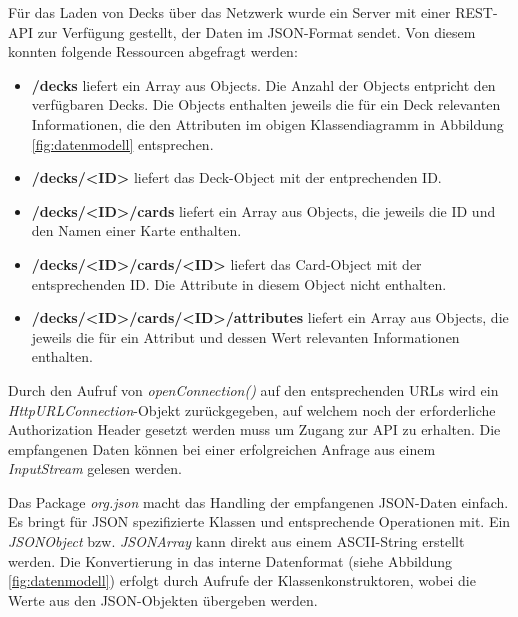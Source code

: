 Für das Laden von Decks über das Netzwerk wurde ein Server mit einer REST-API zur Verfügung gestellt, der Daten im JSON-Format sendet. Von diesem konnten folgende Ressourcen abgefragt werden:
\begin{itemize}
    \item \textbf{/decks} liefert ein Array aus Objects. Die Anzahl der Objects entpricht den verfügbaren Decks. Die Objects enthalten jeweils die für ein Deck relevanten Informationen, die den Attributen im obigen Klassendiagramm in Abbildung \ref{fig:datenmodell} entsprechen.
    \item \textbf{/decks/<ID>} liefert das Deck-Object mit der entprechenden ID.
    \item \textbf{/decks/<ID>/cards} liefert ein Array aus Objects, die jeweils die ID und den Namen einer Karte enthalten.
    \item \textbf{/decks/<ID>/cards/<ID>} liefert das Card-Object mit der entsprechenden ID. Die Attribute in diesem Object nicht enthalten.
    \item \textbf{/decks/<ID>/cards/<ID>/attributes} liefert ein Array aus Objects, die jeweils die für ein Attribut und dessen Wert relevanten Informationen enthalten.
\end{itemize}

Durch den Aufruf von \emph{openConnection()} auf den entsprechenden URLs wird ein \emph{HttpURLConnection}-Objekt zurückgegeben, auf welchem noch der erforderliche Authorization Header gesetzt werden muss um Zugang zur API zu erhalten. Die empfangenen Daten können bei einer erfolgreichen Anfrage aus einem \emph{InputStream} gelesen werden. 

Das Package \emph{org.json} macht das Handling der empfangenen JSON-Daten einfach. Es bringt für JSON spezifizierte Klassen und entsprechende Operationen mit. Ein \emph{JSONObject} bzw. \emph{JSONArray} kann direkt aus einem ASCII-String erstellt werden. Die Konvertierung in das interne Datenformat (siehe Abbildung \ref{fig:datenmodell}) erfolgt durch Aufrufe der Klassenkonstruktoren, wobei die Werte aus den JSON-Objekten übergeben werden.